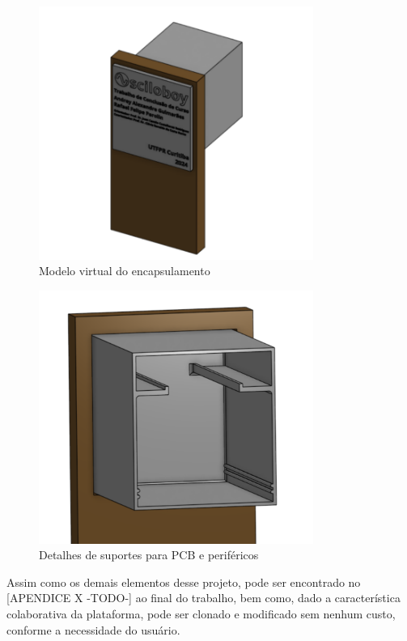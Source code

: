 \begin{figure}[htb!]
    \caption{Modelo virtual do encapsulamento}
    \label{fig:osciloboy-isometrico}
    \includegraphics[width=0.8\textwidth]{figuras/osciloboy-case-1.png}
    \fonte{}
\end{figure}

\begin{figure}[htb!]
    \caption{Detalhes de suportes para PCB e periféricos}
    \label{fig:osciloboy-detalhes}
    \includegraphics[width=0.8\textwidth]{figuras/osciloboy-case-2.png}
    \fonte{}
\end{figure}

Assim como os demais elementos desse projeto, pode ser encontrado no [APENDICE X -TODO-] ao final do trabalho, bem como, dado a característica colaborativa da plataforma, pode ser clonado e modificado sem nenhum custo, conforme a necessidade do usuário.